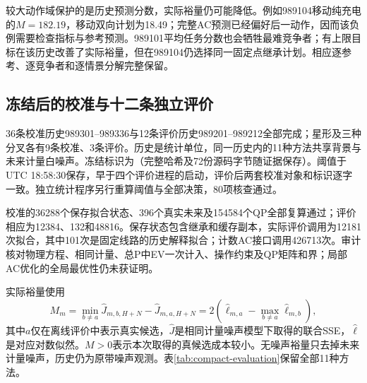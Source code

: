 \documentclass[UTF8,fontset=fandol,11pt,a4paper]{ctexart}
\begin{document}
较大动作域保护的是历史预测分数，实际裕量仍可能降低。例如989104移动纯充电的$M=182.19$，移动双向计划为18.49；完整AC预测已经偏好后一动作，因而该负例需要检查指标与参考预测。989101平均任务分数也会牺牲最难竞争者；有上限目标在该历史改善了实际裕量，但在989104仍选择同一固定点继承计划。相应逐参考、逐竞争者和逐情景分解完整保留。

\subsection{冻结后的校准与十二条独立评价}
36条校准历史989301--989336与12条评价历史989201--989212全部完成；星形及三种分叉各有9条校准、3条评价。历史是统计单位，同一历史内的11种方法共享背景与未来计量白噪声。冻结标识为（完整哈希及72份源码字节随证据保存）。阈值于UTC 18:58:30保存，早于四个评价进程的启动，评价后两套校准对象和标识逐字一致。独立统计程序另行重算阈值与全部决策，80项核查通过。

校准的36288个保存拟合状态、396个真实未来及154584个QP全部复算通过；评价相应为12384、132和48816。保存状态包含继承和缓存副本，实际评价调用为12181次拟合，其中101次是固定线路的历史解释拟合；计数AC接口调用426713次。审计核对物理方程、相同计量、总P中EV一次计入、操作约束及QP矩阵和界；局部AC优化的全局最优性仍未获证明。

实际裕量使用
\begin{equation}
 M_m=\min_{b\ne a}\widehat J_{m,b,H+N}-\widehat J_{m,a,H+N}
     =2\left(\widehat\ell_{m,a}-\max_{b\ne a}\widehat\ell_{m,b}\right),
 \label{eq:compact-actual-margin}
\end{equation}
其中$a$仅在离线评价中表示真实候选，$\widehat J$是相同计量噪声模型下取得的联合SSE，$\widehat\ell$是对应对数似然。$M>0$表示本次取得的真候选成本较小。无噪声裕量只去掉未来计量噪声，历史仍为原带噪声观测。表\ref{tab:compact-evaluation}保留全部11种方法。
\end{document}
